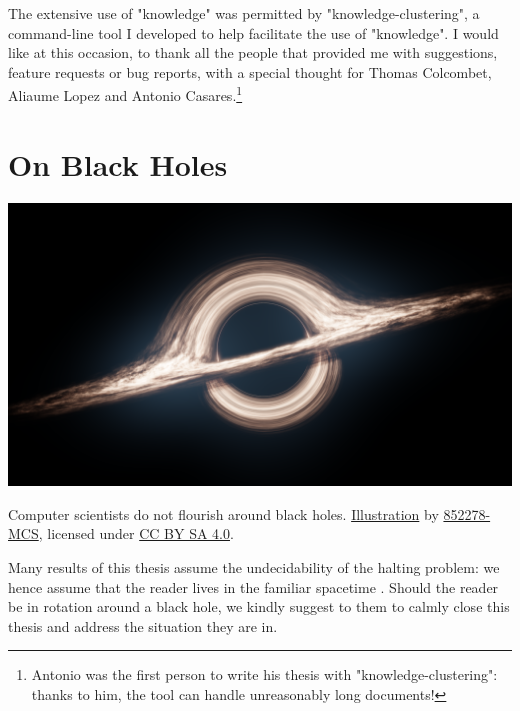 The extensive use of "knowledge" was permitted by "knowledge-clustering",
a command-line tool I developed to help facilitate the use of "knowledge".
I would like at this occasion, to thank all the people that provided me with suggestions,
feature requests or bug reports, with a special thought for Thomas Colcombet, Aliaume Lopez
and Antonio Casares.\footnote{Antonio was the first person to write his thesis
with "knowledge-clustering": thanks to him, the tool can handle
unreasonably long documents!}

\section*{On Black Holes}

\begin{marginfigure}
	\centering
	\includegraphics[width=\linewidth]{fig/intro/black-hole.png}
	\caption{
		Computer scientists do not flourish around black holes.
		\href{https://commons.wikimedia.org/wiki/File:Black_Hole_Full.png}{Illustration}
		by \href{https://commons.wikimedia.org/wiki/User:852278-MCS}{852278-MCS},
		licensed under \href{https://creativecommons.org/licenses/by-sa/4.0/deed.en}{CC BY SA 4.0}.
	}
\end{marginfigure}
Many results of this thesis assume the undecidability of the halting problem:
we hence assume that the reader lives in the familiar spacetime \cite{Hogarth1994NonTuring}.
Should the reader be in rotation around a black hole, we kindly suggest
to them to calmly close this thesis and address the situation they are in.